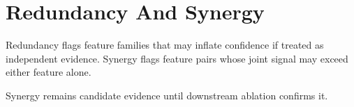 \section{Redundancy And Synergy}

Redundancy flags feature families that may inflate confidence if treated as independent evidence. Synergy flags feature pairs whose joint signal may exceed either feature alone.

Synergy remains candidate evidence until downstream ablation confirms it.

